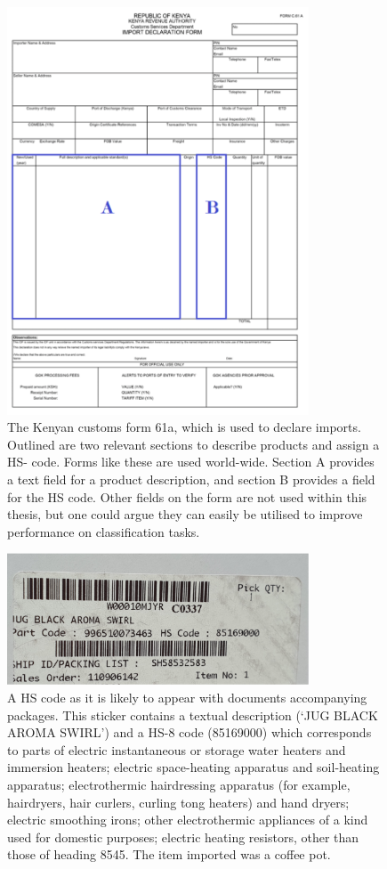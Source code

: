 \begin{figure}
    \centering
    \includegraphics[width=0.8\textwidth]{kenya.png}
    \caption{The Kenyan customs form 61a, which is used to declare imports. Outlined are two relevant sections to describe products and assign a HS- code. Forms like these are used world-wide. Section A provides a text field for a product description, and section B provides a field for the HS code. Other fields on the form are not used within this thesis, but one could argue they can easily be utilised to improve performance on classification tasks.}
    \label{fig:kenya}
\end{figure}


\begin{figure}
    \centering
    \includegraphics[width=0.8\textwidth]{sticker.png}
    \caption{A HS code as it is likely to appear with documents accompanying packages. This sticker contains a textual description (‘JUG BLACK AROMA SWIRL’) and a HS-8 code (85169000) which corresponds to parts of electric instantaneous or storage water heaters and immersion heaters; electric space-heating apparatus and soil-heating apparatus; electrothermic hairdressing apparatus (for example, hairdryers, hair curlers, curling tong heaters) and hand dryers; electric smoothing irons; other electrothermic appliances of a kind used for domestic purposes; electric heating resistors, other than those of heading 8545. The item imported was a coffee pot.}
    \label{fig:stickers}
\end{figure}

